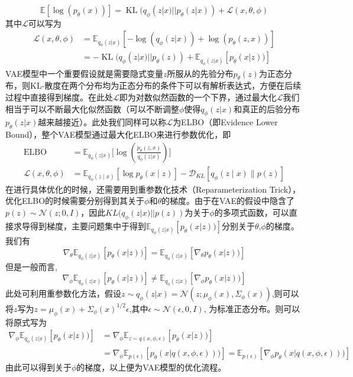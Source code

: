 \begin{equation}
    \mathbb{E}[\log(p_{\theta}(x))] = \operatorname{KL}(q_{\phi}(z|x)||p_{\theta}(z|x)) + \mathcal{L}(x,\theta,\phi)
\end{equation}
其中$\mathcal{L}$可以写为
\begin{align}
    \mathcal{L}(x,\theta,\phi) &= \mathbb{E}_{q_{\phi}(z|x)}\left[-\log(q_{\phi}(z|x))+\log(p_{\theta}(z,x))\right]\\
    &=-\operatorname{KL}(q_{\phi}(z|x)||p_{\theta}(z))+\mathbb{E}_{q_{\phi}(z|x)}\left[p_{\theta}(x|z))\right]
\end{align}
VAE模型中一个重要假设就是需要隐式变量$z$所服从的先验分布$p_{\theta}(z)$为正态分布，则KL-散度在两个分布均为正态分布的条件下可以有解析表达式，方便在后续过程中直接得到梯度。在此处$\mathcal{L}$即为对数似然函数的一个下界，通过最大化$\mathcal{L}$我们相当于可以不断最大化似然函数（可以不断调整$\phi$使得$q_{\phi}(z|x)$和真正的后验分布$p_{\theta}(z|x)$越来越接近）。此处我们同样可以称$\mathcal{L}$为ELBO（即Evidence Lower Bound），整个VAE模型通过最大化ELBO来进行参数优化，即
\begin{align}
\operatorname{ELBO}&=\mathbb{E}_{q_{\phi}(z|x)}\big[\log(\frac{p_{\theta}(z,x)}{q_{\phi}(z|x)})\big]\\
    \mathcal{L}(x,\theta, \phi)&=\mathbb{E}_{q_\phi(z \mid x)}\left[\log p_\theta(x \mid z)\right]-\mathcal{D}_{K L}\left[q_\phi(z \mid x) \| p(z)\right]
    \end{align}
在进行具体优化的时候，还需要用到重参数化技术（Reparameterization Trick），优化ELBO的时候需要分别得到其关于$\phi$和$\theta$的梯度。由于在VAE的假设中隐含了$p(z)\sim \mathcal{N}(z;0,I)$，因此$KL(q_{\phi}(z|x)||p(z))$为关于$\phi$的多项式函数，可以直接求导得到梯度，主要问题集中于得到$\mathbb{E}_{q_{\phi}(z|x)}\left[p_{\theta}(x|z))\right]$分别关于$\theta$,$\phi$的梯度。我们有
\begin{equation}
    \nabla_{\theta}\mathbb{E}_{q_{\phi}(z|x)}\left[p_{\theta}(x|z))\right] = \mathbb{E}_{q_{\phi}(z|x)}\left[\nabla_{\theta}p_{\theta}(x|z))\right]
\end{equation}
但是一般而言,
\begin{equation}
    \nabla_{\phi}\mathbb{E}_{q_{\phi}(z|x)}\left[p_{\theta}(x|z))\right]\neq \mathbb{E}_{q_{\phi}(z|x)}\left[\nabla_{\phi}p_{\theta}(x|z))\right]
\end{equation}
此处可利用重参数化方法，假设$z\sim q_{\phi}(z|x)=\mathcal{N}(z;\mu_{\phi}(x),\Sigma_{\phi}(x))$,则可以将$z$写为$z = \mu_{\phi}(x) +\Sigma_{\phi}(x)^{1/2} \epsilon $,其中$\epsilon \sim \mathcal{N}(\epsilon,0,I)$, 为标准正态分布。则可以将原式写为
\begin{align}
    \nabla_{\phi}\mathbb{E}_{q_{\phi}(z|x)}\left[p_{\theta}(x|z))\right]&=\nabla_{\phi}\mathbb{E}_{z\sim q(x,\phi,\epsilon)}\left[p_{\theta}(x|z))\right]\\
    &= \nabla_{\phi}\mathbb{E}_{p(\epsilon)}\left[p_{\theta}(x|q(x,\phi,\epsilon)))\right]= \mathbb{E}_{p(\epsilon)}\left[\nabla_{\phi} p_{\theta}(x|q(x,\phi,\epsilon)))\right]
\end{align}
由此可以得到关于$\phi$的梯度，以上便为VAE模型的优化流程。
